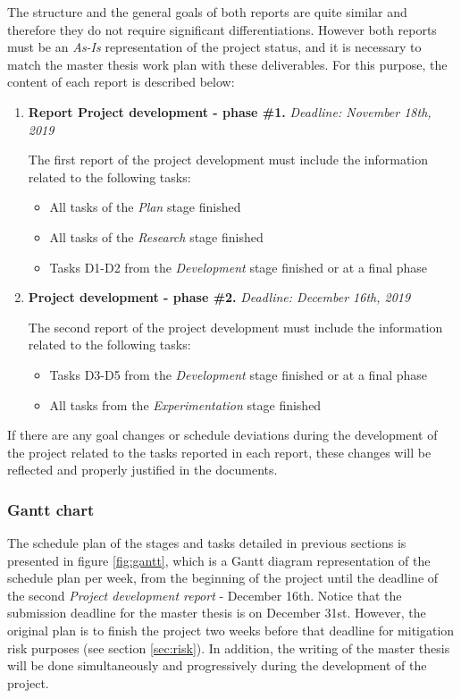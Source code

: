 \documentclass[11pt]{article}
\begin{document}
The structure and the general goals of both reports are quite similar and therefore they do not require significant differentiations. However both reports must be an \textit{As-Is} representation of the project status, and it is necessary to match the master thesis work plan with these deliverables. For this purpose, the content of each report is described below:

\begin{enumerate}
\item \textbf{Report Project development - phase \#1.} \textit{Deadline: November 18th, 2019}

The first report of the project development must include the information related to the following tasks:
\begin{itemize}
\item All tasks of the \textit{Plan} stage finished
\item All tasks of the \textit{Research} stage finished
\item Tasks D1-D2 from the \textit{Development} stage finished or at a final phase
\end{itemize}
\item \textbf{Project development - phase \#2.} \textit{Deadline: December 16th, 2019} 

The second report of the project development must include the information related to the following tasks:\begin{itemize}
\item Tasks D3-D5 from the \textit{Development} stage finished or at a final phase
\item All tasks from the \textit{Experimentation} stage finished
\end{itemize}

\end{enumerate}

If there are any goal changes or schedule deviations during the development of the project related to the tasks reported in each report, these changes will be reflected and properly justified in the documents.

\subsubsection{Gantt chart}

The schedule plan of the stages and tasks detailed in previous sections is presented in figure \ref{fig:gantt}, which is a Gantt diagram representation of the schedule plan per week, from the beginning of the project until the deadline of the second \textit{Project development report} - December 16th. Notice that the submission deadline for the master thesis is on December 31st. However, the original plan is to finish the project two weeks before that deadline for mitigation risk purposes (see section \ref{sec:risk}). In addition, the writing of the master thesis will be done simultaneously and progressively during the development of the project.
\end{document}
